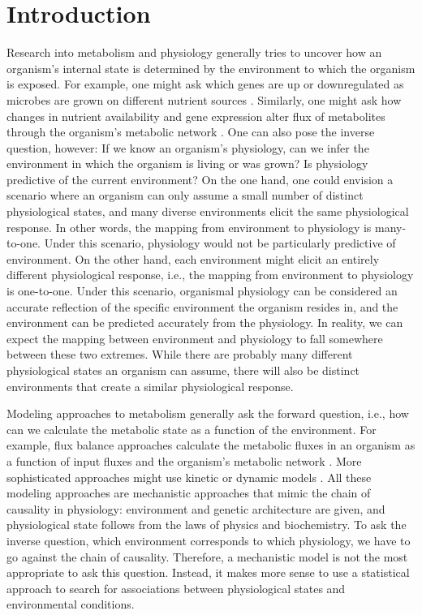 \documentclass[12pt]{article}
\begin{document}

\section{Introduction}

Research into metabolism and physiology generally tries to uncover how an organism's internal state is determined by the environment to which the organism is exposed. For example, one might ask which genes are up or downregulated as microbes are grown on different nutrient sources \cite{Taoetal1999,Huaetal2004,Wuetal2004}. Similarly, one might ask how changes in nutrient availability and gene expression alter flux of metabolites through the organism's metabolic network \cite{FischerSauer2003,Leeetal2009,Boeretal2010,HaverkornvanRijsewijketal2011}. One can also pose the inverse question, however: If we know an organism's physiology, can we infer the environment in which the organism is living or was grown? Is physiology predictive of the current environment? On the one hand, one could envision a scenario where an organism can only assume a small number of distinct physiological states, and many diverse environments elicit the same physiological response. In other words, the mapping from environment to physiology is many-to-one. Under this scenario, physiology would not be particularly predictive of environment. On the other hand, each environment might elicit an entirely different physiological response, i.e., the mapping from environment to physiology is one-to-one. Under this scenario, organismal physiology can be considered an accurate reflection of the specific environment the organism resides in, and the environment can be predicted accurately from the physiology. In reality, we can expect the mapping between environment and physiology to fall somewhere between these two extremes. While there are probably many different physiological states an organism can assume, there will also be distinct environments that create a similar physiological response.

Modeling approaches to metabolism generally ask the forward question, i.e., how can we calculate the metabolic state as a function of the environment. For example, flux balance approaches calculate the metabolic fluxes in an organism as a function of input fluxes and the organism's metabolic network \cite{Segreetal2002,Feistetal2007,SnitkinSegre2008,Orthetal2010}. More sophisticated approaches might use kinetic or dynamic models \cite{Covertetal2008,Adadietal2012}. All these modeling approaches are mechanistic approaches that mimic the chain of causality in physiology: environment and genetic architecture are given, and physiological state follows from the laws of physics and biochemistry. To ask the inverse question, which environment corresponds to which physiology, we have to go against the chain of causality. Therefore, a mechanistic model is not the most appropriate to ask this question. Instead, it makes more sense to use a statistical approach to search for associations between physiological states and environmental conditions.
\end{document}
